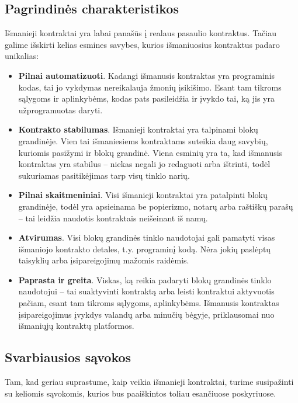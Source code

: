 \documentclass{VUMIFPSkursinis}
\begin{document}
\subsection{Pagrindinės charakteristikos}
Išmanieji kontraktai yra labai panašūs į realaus pasaulio kontraktus. Tačiau galime išskirti kelias esmines savybes, kurios išmaniuosius kontraktus padaro unikalias:
\begin{itemize}
    \item \textbf{Pilnai automatizuoti}. Kadangi išmanusis kontraktas yra programinis kodas, tai jo vykdymas nereikalauja žmonių įsikišimo. Esant tam tikroms sąlygoms ir aplinkybėms, kodas pats pasileidžia ir įvykdo tai, ką jis yra užprogramuotas daryti.
    \item \textbf{Kontrakto stabilumas}. Išmanieji kontraktai yra talpinami blokų grandinėje. Vien tai išmaniesiems kontraktams suteikia daug savybių, kuriomis pasižymi ir blokų grandinė. Viena esminių yra ta, kad išmanusis kontraktas yra stabilus – niekas negali jo redaguoti arba ištrinti, todėl sukuriamas pasitikėjimas tarp visų tinklo narių.
    \item \textbf{Pilnai skaitmeniniai}. Visi išmanieji kontraktai yra patalpinti blokų grandinėje, todėl yra apsieinama be popierizmo, notarų arba raštiškų parašų – tai leidžia naudotis kontraktais neišeinant iš namų.
    \item \textbf{Atvirumas}. Visi blokų grandinės tinklo naudotojai gali pamatyti visas išmaniojo kontrakto detales, t.y. programinį kodą. Nėra jokių paslėptų taisyklių arba įsipareigojimų mažomis raidėmis.
    \item \textbf{Paprasta ir greita}. Viskas, ką reikia padaryti blokų grandinės tinklo naudotojui – tai suaktyvinti kontraktą arba leisti kontraktui aktyvuotis pačiam, esant tam tikroms sąlygoms, aplinkybėms. Išmanusis kontraktas įsipareigojimus įvykdys valandų arba minučių bėgyje, priklausomai nuo išmaniųjų kontraktų platformos.
\end{itemize}

\subsection{Svarbiausios sąvokos}
Tam, kad geriau suprastume, kaip veikia išmanieji kontraktai, turime susipažinti su keliomis sąvokomis, kurios bus paaiškintos toliau esančiuose poskyriuose. 
\end{document}
